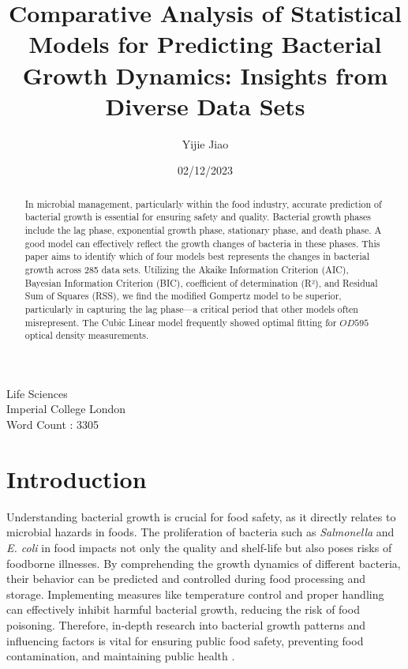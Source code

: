 \documentclass[11pt]{article}
\title{Comparative Analysis of Statistical Models for Predicting Bacterial Growth Dynamics: Insights from Diverse Data Sets}
\author{Yijie Jiao}
\date{02/12/2023}
\begin{document}
\maketitle

\begin{center}
Life Sciences \\
Imperial College London \\
Word Count : 3305
\end{center}
\linenumbers
\begin{abstract}

In microbial management, particularly within the food industry, accurate prediction of bacterial growth is essential for ensuring safety and quality. Bacterial growth phases include the lag phase, exponential growth phase, stationary phase, and death phase. A good model can effectively reflect the growth changes of bacteria in these phases. This paper aims to identify which of four models best represents the changes in bacterial growth across 285 data sets. Utilizing the Akaike Information Criterion (AIC), Bayesian Information Criterion (BIC), coefficient of determination (R²), and Residual Sum of Squares (RSS), we find the modified Gompertz model to be superior, particularly in capturing the lag phase—a critical period that other models often misrepresent. The Cubic Linear model frequently showed optimal fitting for $OD595$ optical density measurements. 

\end{abstract}

\section{Introduction}
Understanding bacterial growth is crucial for food safety, as it directly relates to microbial hazards in foods. The proliferation of bacteria such as \textit{Salmonella} and \textit{E. coli} in food impacts not only the quality and shelf-life but also poses risks of foodborne illnesses.\cite{rabilloud2018optimization} By comprehending the growth dynamics of different bacteria, their behavior can be predicted and controlled during food processing and storage. \cite{schwartzberg1992physical} Implementing measures like temperature control and proper handling can effectively inhibit harmful bacterial growth, reducing the risk of food poisoning. Therefore, in-depth research into bacterial growth patterns and influencing factors is vital for ensuring public food safety, preventing food contamination, and maintaining public health \cite{Ross2003Modeling}.
\end{document}
